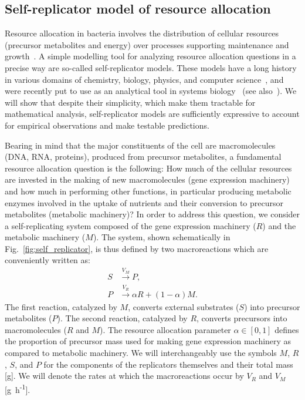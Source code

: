 \subsection*{Self-replicator model of resource allocation}
\label{sec:model}

Resource allocation in bacteria involves the distribution of cellular resources (precursor metabolites and energy) over processes supporting maintenance and growth~\cite{schaechter_microbe_2006}.
A simple modelling tool for analyzing resource allocation questions in a precise way are so-called self-replicator models.
These models have a long history in various domains of chemistry, biology, physics, and computer science~\cite{sipper_fifty_1998}, and were recently put to use as an analytical tool in systems biology~\cite{molenaar_shifts_2009} (see also~\cite{flamm_minimal_2007}).
We will show that despite their simplicity, which make them tractable for mathematical analysis, self-replicator models are sufficiently expressive to account for empirical observations and make testable predictions.

Bearing in mind that the major constituents of the cell are macromolecules (DNA, RNA, proteins), produced from precursor metabolites, a fundamental resource allocation question is the following: How much of the cellular resources are invested in the making of new macromolecules (gene expression machinery) and how much in performing other functions, in particular producing metabolic enzymes involved in the uptake of nutrients and their conversion to precursor metabolites (metabolic machinery)?
In order to address this question, we consider a self-replicating system composed of the gene expression machinery ($R$) and the metabolic machinery ($M$).
The system, shown schematically in Fig.~\ref{fig:self_replicator}, is thus defined by two macroreactions which are conveniently written as:
\begin{equation}\label{eq:reactions}
\begin{aligned}
S &\overset{V_M}{\longrightarrow} P, \\
P &\overset{V_R}{\longrightarrow} \alpha R + (1-\alpha) M.
\end{aligned}
\end{equation}
The first reaction, catalyzed by $M$, converts external substrates ($S$) into precursor metabolites ($P$).
The second reaction, catalyzed by $R$, converts precursors into macromolecules ($R$ and $M$).
The resource allocation parameter $\alpha \in [0,1]$ defines the proportion of precursor mass used for making gene expression machinery as compared to metabolic machinery.
We will interchangeably use the symbols $M$, $R$, $S$, and $P$ for the components of the replicators themselves and their total mass [g].
We will denote the rates at which the macroreactions occur by $V_R$ and $V_M$ [g~h\textsuperscript{-1}].

